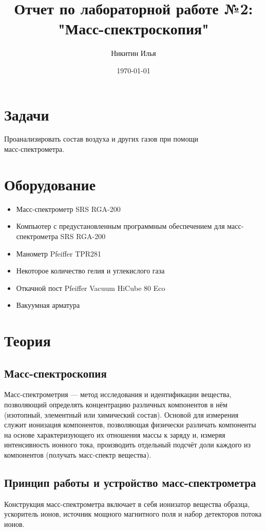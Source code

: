 \documentclass[a4paper,14pt]{extarticle}
\author{Никитин Илья}
\title{Отчет по лабораторной работе №2: "Масс-спектроскопия"}
\date{\today}
\begin{document}
	
	\maketitle
	\tableofcontents

	\section{Задачи}
		Проанализировать состав воздуха и других газов при помощи \\ масс-спектрометра. 
	\section{Оборудование}
		\begin{itemize}
			\item Масс-спектрометр SRS RGA-200
			\item Компьютер с предустановленным программным обеспечением для масс-спектрометра SRS RGA-200
			\item Манометр Pfeiffer TPR281
			\item Некоторое количество гелия и углекислого газа
			\item Откачной пост Pfeiffer Vacuum HiCube 80 Eco
			\item Вакуумная арматура
		\end{itemize}
	\section{Теория}
		\subsection{Масс-спектроскопия}
			Масс-спектрометрия — метод исследования и идентификации вещества, позволяющий определять концентрацию различных компонентов в нём (изотопный, элементный или химический состав). Основой для измерения служит ионизация компонентов, позволяющая физически различать компоненты на основе характеризующего их отношения массы к заряду и, измеряя интенсивность ионного тока, производить отдельный подсчёт доли каждого из компонентов (получать масс-спектр вещества).
		\subsection{Принцип работы и устройство масс-спектрометра}
			Конструкция масс-спектрометра включает в себя ионизатор вещества образца, ускоритель ионов, источник мощного магнитного поля и набор детекторов потока ионов.
			
\end{document}
